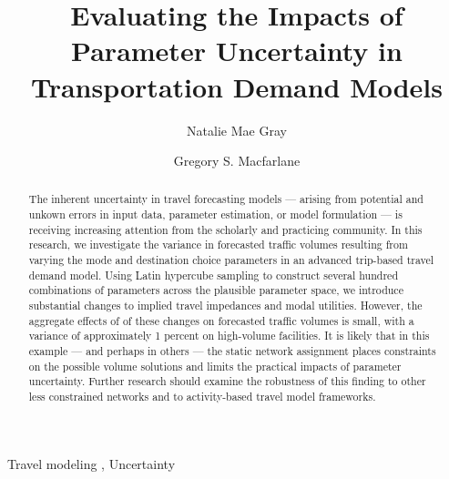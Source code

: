\documentclass[
  letterpaper,
  authoryear,
  review,
  3p]{elsarticle}
\begin{document}
\begin{frontmatter}
\title{Evaluating the Impacts of Parameter Uncertainty in Transportation
Demand Models}
\author[1]{Natalie Mae Gray%
%
}
\author[1]{Gregory S. Macfarlane%
%
}




        
\begin{abstract}
The inherent uncertainty in travel forecasting models --- arising from
potential and unkown errors in input data, parameter estimation, or
model formulation --- is receiving increasing attention from the
scholarly and practicing community. In this research, we investigate the
variance in forecasted traffic volumes resulting from varying the mode
and destination choice parameters in an advanced trip-based travel
demand model. Using Latin hypercube sampling to construct several
hundred combinations of parameters across the plausible parameter space,
we introduce substantial changes to implied travel impedances and modal
utilities. However, the aggregate effects of of these changes on
forecasted traffic volumes is small, with a variance of approximately 1
percent on high-volume facilities. It is likely that in this example ---
and perhaps in others --- the static network assignment places
constraints on the possible volume solutions and limits the practical
impacts of parameter uncertainty. Further research should examine the
robustness of this finding to other less constrained networks and to
activity-based travel model frameworks.
\end{abstract}





\begin{keyword}
    Travel modeling \sep 
    Uncertainty
\end{keyword}
\end{frontmatter}
    \ifdefined\Shaded\renewenvironment{Shaded}{\begin{tcolorbox}[boxrule=0pt, frame hidden, enhanced, borderline west={3pt}{0pt}{shadecolor}, interior hidden, sharp corners, breakable]}{\end{tcolorbox}}\fi

\end{document}
